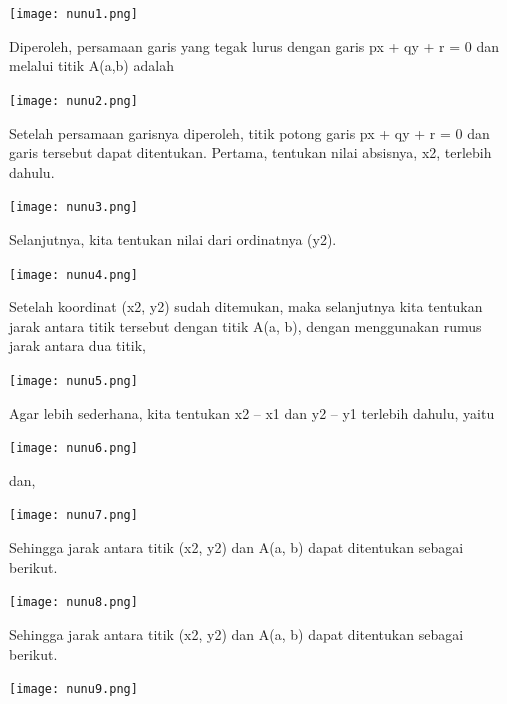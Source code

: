 \documentclass[11pt,fleqn]{book} %
\begin{document}
\begin{center}
\texttt{[image: nunu1.png]}
\end{center}

Diperoleh, persamaan garis yang tegak lurus dengan garis px + qy + r = 0 dan melalui titik A(a,b) adalah

\begin{center}
\texttt{[image: nunu2.png]}
\end{center}

Setelah persamaan garisnya diperoleh, titik potong garis px + qy + r = 0 dan garis tersebut dapat ditentukan. Pertama, tentukan nilai absisnya, x2,  terlebih dahulu.

\begin{center}
\texttt{[image: nunu3.png]}
\end{center}

Selanjutnya, kita tentukan nilai dari ordinatnya (y2).

\begin{center}
\texttt{[image: nunu4.png]}
\end{center}

Setelah koordinat (x2, y2) sudah ditemukan, maka selanjutnya kita tentukan jarak antara titik tersebut dengan titik A(a, b), dengan menggunakan rumus jarak antara dua titik,

\begin{center}
\texttt{[image: nunu5.png]}
\end{center}

Agar lebih sederhana, kita tentukan x2 – x1 dan y2 – y1 terlebih dahulu, yaitu

\begin{center}
\texttt{[image: nunu6.png]}
\end{center}

dan,

\begin{center}
\texttt{[image: nunu7.png]}
\end{center}

Sehingga jarak antara titik (x2, y2) dan A(a, b) dapat ditentukan sebagai berikut.

\begin{center}
\texttt{[image: nunu8.png]}
\end{center}

Sehingga jarak antara titik (x2, y2) dan A(a, b) dapat ditentukan sebagai berikut.

\begin{center}
\texttt{[image: nunu9.png]}
\end{center}
\end{document}
